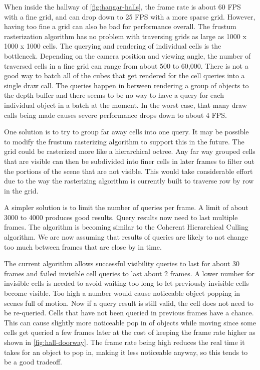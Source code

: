 \documentclass[12pt]{ucthesis}
\begin{document}
When inside the hallway of \ref{fig:hangar-halls}, the frame rate is about 60 FPS with a fine grid, and can drop down to 25 FPS with a more sparse grid.
However, having too fine a grid can also be bad for performance overall.
The frustum rasterization algorithm has no problem with traversing grids as large as 1000 x 1000 x 1000 cells.
The querying and rendering of individual cells is the bottleneck.
Depending on the camera position and viewing angle, the number of traversed cells in a fine grid can range from about 500 to 60,000.
There is not a good way to batch all of the cubes that get rendered for the cell queries into a single draw call.
The queries happen in between rendering a group of objects to the depth buffer and there seems to be no way to have a query for each individual object in a batch at the moment.
In the worst case, that many draw calls being made causes severe performance drops down to about 4 FPS.

One solution is to try to group far away cells into one query.
It may be possible to modify the frustum rasterizing algorithm to support this in the future.
The grid could be rasterized more like a hierarchical octree.
Any far way grouped cells that are visible can then be subdivided into finer cells in later frames to filter out the portions of the scene that are not visible.
This would take considerable effort due to the way the rasterizing algorithm is currently built to traverse row by row in the grid.

A simpler solution is to limit the number of queries per frame.
A limit of about 3000 to 4000 produces good results.
Query results now need to last multiple frames.
The algorithm is becoming similar to the Coherent Hierarchical Culling algorithm.\cite{CHC, CHCpp}
We are now assuming that results of queries are likely to not change too much between frames that are close by in time. 

The current algorithm allows successful visibility queries to last for about 30 frames and failed invisible cell queries to last about 2 frames.
A lower number for invisible cells is needed to avoid waiting too long to let previously invisible cells become visible.
Too high a number would cause noticeable object popping in scenes full of motion.
Now if a query result is still valid, the cell does not need to be re-queried.
Cells that have not been queried in previous frames have a chance.
This can cause slightly more noticeable pop in of objects while moving since some cells get queried a few frames later at the cost of keeping the frame rate higher as shown in \ref{fig:hall-doorway}.
The frame rate being high reduces the real time it takes for an object to pop in, making it less noticeable anyway, so this tends to be a good tradeoff.
\end{document}
